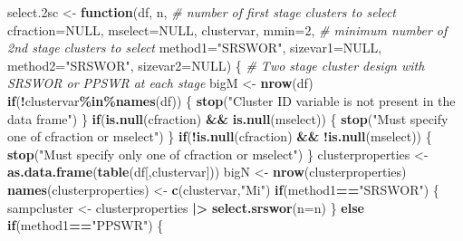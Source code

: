 \documentclass[
]{book}
\newenvironment{Shaded}{\begin{snugshade}}{\end{snugshade}}
\newcommand{\AttributeTok}[1]{\textcolor[rgb]{0.13,0.29,0.53}{#1}}
\newcommand{\CommentTok}[1]{\textcolor[rgb]{0.56,0.35,0.01}{\textit{#1}}}
\newcommand{\ConstantTok}[1]{\textcolor[rgb]{0.56,0.35,0.01}{#1}}
\newcommand{\ControlFlowTok}[1]{\textcolor[rgb]{0.13,0.29,0.53}{\textbf{#1}}}
\newcommand{\DecValTok}[1]{\textcolor[rgb]{0.00,0.00,0.81}{#1}}
\newcommand{\FloatTok}[1]{\textcolor[rgb]{0.00,0.00,0.81}{#1}}
\newcommand{\FunctionTok}[1]{\textcolor[rgb]{0.13,0.29,0.53}{\textbf{#1}}}
\newcommand{\NormalTok}[1]{#1}
\newcommand{\OtherTok}[1]{\textcolor[rgb]{0.56,0.35,0.01}{#1}}
\newcommand{\SpecialCharTok}[1]{\textcolor[rgb]{0.81,0.36,0.00}{\textbf{#1}}}
\newcommand{\StringTok}[1]{\textcolor[rgb]{0.31,0.60,0.02}{#1}}
\begin{document}
\begin{Shaded}
\begin{Highlighting}[]
\NormalTok{select}\FloatTok{.2}\NormalTok{sc }\OtherTok{\textless{}{-}} \ControlFlowTok{function}\NormalTok{(df, n, }\CommentTok{\# number of first stage clusters to select}
                       \AttributeTok{cfraction=}\ConstantTok{NULL}\NormalTok{, }\AttributeTok{mselect=}\ConstantTok{NULL}\NormalTok{, clustervar,}
                       \AttributeTok{mmin=}\DecValTok{2}\NormalTok{, }\CommentTok{\# minimum number of 2nd stage clusters to select}
                       \AttributeTok{method1=}\StringTok{"SRSWOR"}\NormalTok{, }\AttributeTok{sizevar1=}\ConstantTok{NULL}\NormalTok{,}
                       \AttributeTok{method2=}\StringTok{"SRSWOR"}\NormalTok{, }\AttributeTok{sizevar2=}\ConstantTok{NULL}\NormalTok{) \{}
  \CommentTok{\# Two stage cluster design with SRSWOR or PPSWR at each stage}
\NormalTok{  bigM }\OtherTok{\textless{}{-}} \FunctionTok{nrow}\NormalTok{(df)}
  \ControlFlowTok{if}\NormalTok{(}\SpecialCharTok{!}\NormalTok{clustervar}\SpecialCharTok{\%in\%}\FunctionTok{names}\NormalTok{(df)) \{}
    \FunctionTok{stop}\NormalTok{(}\StringTok{"Cluster ID variable is not present in the data frame"}\NormalTok{)}
\NormalTok{  \}}
  \ControlFlowTok{if}\NormalTok{(}\FunctionTok{is.null}\NormalTok{(cfraction) }\SpecialCharTok{\&\&} \FunctionTok{is.null}\NormalTok{(mselect)) \{}
    \FunctionTok{stop}\NormalTok{(}\StringTok{"Must specify one of cfraction or mselect"}\NormalTok{)}
\NormalTok{  \}}
  \ControlFlowTok{if}\NormalTok{(}\SpecialCharTok{!}\FunctionTok{is.null}\NormalTok{(cfraction) }\SpecialCharTok{\&\&} \SpecialCharTok{!}\FunctionTok{is.null}\NormalTok{(mselect)) \{}
    \FunctionTok{stop}\NormalTok{(}\StringTok{"Must specify only one of cfraction or mselect"}\NormalTok{)}
\NormalTok{  \}}
\NormalTok{  clusterproperties }\OtherTok{\textless{}{-}} \FunctionTok{as.data.frame}\NormalTok{(}\FunctionTok{table}\NormalTok{(df[,clustervar]))}
\NormalTok{  bigN }\OtherTok{\textless{}{-}} \FunctionTok{nrow}\NormalTok{(clusterproperties)}
  \FunctionTok{names}\NormalTok{(clusterproperties) }\OtherTok{\textless{}{-}} \FunctionTok{c}\NormalTok{(clustervar,}\StringTok{"Mi"}\NormalTok{)}
  \ControlFlowTok{if}\NormalTok{(method1}\SpecialCharTok{==}\StringTok{"SRSWOR"}\NormalTok{) \{}
\NormalTok{    sampcluster }\OtherTok{\textless{}{-}}\NormalTok{ clusterproperties }\SpecialCharTok{|\textgreater{}}
      \FunctionTok{select.srswor}\NormalTok{(}\AttributeTok{n=}\NormalTok{n)}
\NormalTok{  \} }\ControlFlowTok{else} \ControlFlowTok{if}\NormalTok{(method1}\SpecialCharTok{==}\StringTok{"PPSWR"}\NormalTok{) \{}

\end{Highlighting}
\end{Shaded}
\end{document}
